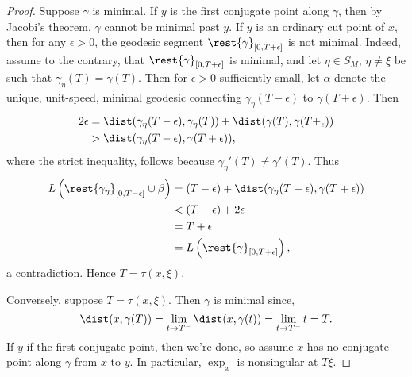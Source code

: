 \begin{proof}
Suppose $\gamma$ is minimal.  If $y$ is the first conjugate point along $\gamma$, then by Jacobi's theorem, $\gamma$ cannot be minimal past $y$.  If $y$ is an ordinary cut point of $x$, then for any $\epsilon>0$, the geodesic segment $\rest{\gamma}_{[0,T+\epsilon]}$ is not minimal.  Indeed, assume to the contrary, that $\rest{\gamma}_{[0,T+\epsilon]}$ is minimal, and let $\eta\in S_M$, $\eta\neq\xi$ be such that $\gamma_\eta(T)=\gamma(T)$.  Then for $\epsilon>0$ sufficiently small, let $\alpha$ denote the unique, unit-speed, minimal geodesic connecting $\gamma_\eta(T-\epsilon)$ to $\gamma(T+\epsilon)$.  Then
\begin{align*}
	2\epsilon&=\dist(\gamma_\eta(T-\epsilon),\gamma_\eta(T))+\dist(\gamma(T),\gamma(T+_\epsilon))\\
	&>\dist(\gamma_\eta(T-\epsilon),\gamma(T+\epsilon)),
\end{align*}
where the strict inequality, follows because $\gamma_\eta'(T)\neq\gamma'(T)$.  Thus
\begin{align*}
	L\left(\rest{\gamma_\eta}_{[0,T-\epsilon]}\cup\beta\right)&=(T-\epsilon)+\dist(\gamma_\eta(T-\epsilon),\gamma(T+\epsilon))\\
	&<(T-\epsilon)+2\epsilon\\
	&=T+\epsilon\\
	&=L\left(\rest{\gamma}_{[0,T+\epsilon]}\right),
\end{align*}
a contradiction.  Hence $T=\tau(x,\xi)$.

Conversely, suppose $T=\tau(x,\xi)$.  Then $\gamma$ is minimal since,
$$\dist(x,\gamma(T))=\lim_{t\to T^-}\dist(x,\gamma(t))=\lim_{t\to T^-}t=T.$$
If $y$ if the first conjugate point, then we're done, so assume $x$ has no conjugate point along $\gamma$ from $x$ to $y$.  In particular, $\exp_x$ is nonsingular at $T\xi$.


\end{proof}
